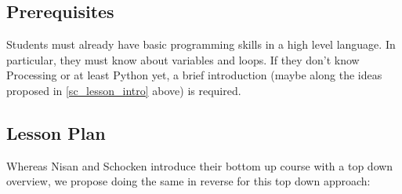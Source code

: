 \subsection{Prerequisites}

Students must already have basic programming skills in a high level language. In particular, they must know about variables and loops. If they don't know Processing or at least Python yet, a brief introduction (maybe along the ideas proposed in \ref{sc_lesson_intro} above) is required.


\subsection{Lesson Plan}

Whereas Nisan and Schocken \cite{Nis21} introduce their bottom up course with a top down overview, we propose doing the same in reverse for this top down approach:

